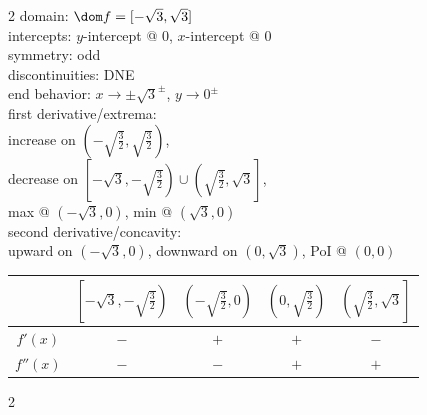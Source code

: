 \documentclass{book}
\begin{document}
\begin{appendices}
\begin{enumerate}[!HW!]
\begin{multicols}{2}
domain: $\dom f = [-\sqrt{3},\sqrt{3}]$ \\
intercepts: $y$-intercept @ 0, $x$-intercept @ 0\\
symmetry: odd \\ 
discontinuities: DNE\\
end behavior: $x\to \pm\sqrt{3}^\pm$, $y\to 0^\pm$\\
first derivative/extrema:\\ increase on $\left(-\sqrt{\frac{3}{2}},\sqrt{\frac{3}{2}}\right)$,\\ decrease on $\left[-\sqrt{3},-\sqrt{\frac{3}{2}}\right)\cup\left(\sqrt{\frac{3}{2}},\sqrt{3}\right]$,\\ max @ $(-\sqrt{3},0)$, min @ $(\sqrt{3},0)$\\
second derivative/concavity:\\ upward on $(-\sqrt{3},0)$, downward on $(0,\sqrt{3})$, PoI @ $(0,0)$\vspace{-15pt}
\begin{center}
\begin{tabular}{c|c|c|c|c}
 & $\left[-\sqrt{3},-\sqrt{\frac{3}{2}}\right)$ & $\left(-\sqrt{\frac{3}{2}}, 0\right)$ & $\left(0,\sqrt{\frac{3}{2}}\right)$ & $\left(\sqrt{\frac{3}{2}}, \sqrt{3}\right]$ \\ \hline
$f'(x)$ & $-$ & $+$ & $+$ & $-$\\ 
$f''(x)$ & $-$ & $-$ & $+$ & $+$ \\ 
\end{tabular}
\end{center}
\end{multicols}
\pagebreak 

\itemspade \mbox{}\vspace{-25pt}

\begin{multicols}{2}
\columnbreak
 

\end{multicols}
\end{enumerate}
\end{appendices}
\end{document}
